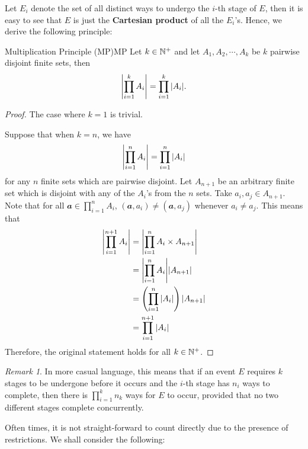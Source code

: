 \documentclass[math]{amznotes}
\theoremstyle{remark}
\newtheorem*{remark}{Remark}
\newcommand{\0}{\mathbf{0}}
\newcommand{\1}{\mathbf{1}}
\begin{document}
Let $E_i$ denote the set of all distinct ways to undergo the $i$-th stage of $E$, then it is easy to see that $E$ is just the \textbf{Cartesian product} of all the $E_i$'s. Hence, we derive the following principle:
\begin{thmbox}{Multiplication Principle (MP)}{MP}
    Let $k \in \mathbb{N}^+$ and let $A_1, A_2, \cdots, A_k$ be $k$ pairwise disjoint finite sets, then
    \begin{equation*}
        {\left\lvert {\prod_{i = 1}^{k}A_i} \right\rvert} = \prod_{i = 1}^{k}{\left\lvert {A_i} \right\rvert}.
    \end{equation*}
    \tcblower
    \begin{proof}
        The case where $k = 1$ is trivial.

        Suppose that when $k = n$, we have
        \begin{equation*}
            {\left\lvert {\prod_{i = 1}^{n}A_i} \right\rvert} = \prod_{i = 1}^{n}{\left\lvert {A_i} \right\rvert}
        \end{equation*} 
        for any $n$ finite sets which are pairwise disjoint. Let $A_{n + 1}$ be an arbitrary finite set which is disjoint with any of the $A_i$'s from the $n$ sets. Take $a_i, a_j \in A_{n + 1}$. Note that for all $\mathbfit{a} \in \prod_{i = 1}^{n}A_i$, $(\mathbfit{a}, a_i) \neq (\mathbfit{a}, a_j)$ whenever $a_i \neq a_j$. This means that
        \begin{align*}
            {\left\lvert {\prod_{i = 1}^{n + 1}A_i} \right\rvert} & = {\left\lvert {\prod_{i = 1}^{n}A_i \times A_{n + 1}} \right\rvert} \\
            & = {\left\lvert {\prod_{i = 1}^{n}A_i} \right\rvert}{\left\lvert {A_{n + 1}} \right\rvert} \\
            & = \left(\prod_{i = 1}^{n}{\left\lvert {A_i} \right\rvert}\right){\left\lvert {A_{n + 1}} \right\rvert} \\
            & = \prod_{i = 1}^{n + 1}{\left\lvert {A_i} \right\rvert}
        \end{align*}
        Therefore, the original statement holds for all $k \in \mathbb{N}^+$.
    \end{proof}
\end{thmbox}
\begin{notebox}
    \begin{remark}
        In more casual language, this means that if an event $E$ requires $k$ stages to be undergone before it occurs and the $i$-th stage has $n_i$ ways to complete, then there is $\prod_{i = 1}^{k}n_k$ ways for $E$ to occur, provided that no two different stages complete concurrently.
    \end{remark}
\end{notebox}
Often times, it is not straight-forward to count directly due to the presence of restrictions. We shall consider the following:
\end{document}
